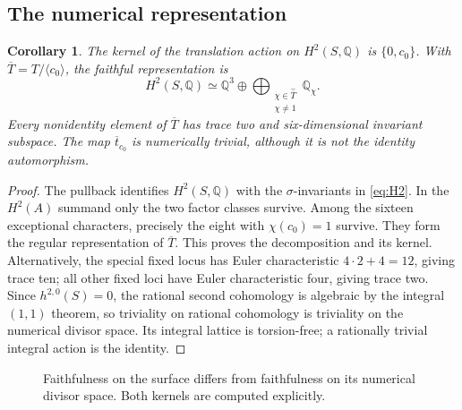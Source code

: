 \documentclass[11pt]{amsart}
\newtheorem{corollary}[theorem]{Corollary}
\theoremstyle{definition}
\newcommand{\Q}{\mathbb Q}\newcommand{\C}{\mathbb C}\newcommand{\Z}{\mathbb Z}
\begin{document}
\subsection{The numerical representation}
\begin{corollary}\label{cor:numerical}
The kernel of the translation action on $H^2(S,\Q)$ is
$\{0,c_0\}$. With $\overline T=T/\langle c_0\rangle$, the faithful
representation is
\[
 H^2(S,\Q)\simeq \Q^3\oplus
       \bigoplus_{\substack{\chi\in\widehat{\overline T}\\\chi\ne1}}\Q_\chi.
\]
Every nonidentity element of $\overline T$ has trace two and
six-dimensional invariant subspace. The map $\overline t_{c_0}$ is
numerically trivial, although it is not the identity automorphism.
\end{corollary}
\begin{proof}
The pullback identifies $H^2(S,\Q)$ with the $\sigma$-invariants in
\eqref{eq:H2}. In the $H^2(A)$ summand only the two factor classes
survive. Among the sixteen exceptional characters, precisely the
eight with $\chi(c_0)=1$ survive. They form the regular representation
of $\overline T$. This proves the decomposition and its kernel.
Alternatively, the special fixed locus has Euler characteristic
$4\cdot2+4=12$, giving trace ten; all other fixed loci have Euler
characteristic four, giving trace two.
Since $h^{2,0}(S)=0$, the rational second cohomology is algebraic by
the integral $(1,1)$ theorem, so triviality on rational cohomology is
triviality on the numerical divisor space. Its integral lattice is
torsion-free; a rationally trivial integral action is the identity.
\end{proof}

\begin{figure}[tb]
\centering
{}
\caption{Faithfulness on the surface differs from faithfulness on its
numerical divisor space. Both kernels are computed explicitly.}
\end{figure}
\end{document}

